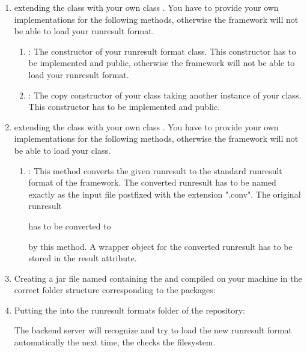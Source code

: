 	\begin{enumerate}
		\item extending the class  with your own class . You have to provide your own implementations for the following methods, otherwise the framework will not be able to load your runresult format.
		\begin{enumerate}
			\item {}: The constructor of your runresult format class. This constructor has to be implemented and public, otherwise the framework will not be able to load your runresult format.
			\item {}: The copy constructor of your class taking another instance of your class. This constructor has to be implemented and public.
		\end{enumerate}
		\item extending the class  with your own class . You have to provide your own implementations for the following methods, otherwise the framework will not be able to load your class.
		\begin{enumerate}
			\item {\footnotesize {}}: This method converts the given runresult to the standard runresult format of the framework. The converted runresult has to be named exactly as the input file postfixed with the extension ".conv". The original runresult 
			
			{\footnotesize {}}
			
			has to be converted to
			
			{\footnotesize {}}
			
			by this method. A wrapper object for the converted runresult has to be stored in the result attribute.
		\end{enumerate}
			\item Creating a jar file named  containing the  and  compiled on your machine in the correct folder structure corresponding to the packages:
			
			
			
			\item Putting the  into the runresult formats folder of the repository:
			
			\highlight{\reposuppresultformats}
			
			The backend server will recognize and try to load the new runresult format automatically the next time, the  checks the filesystem.
	\end{enumerate}
	
